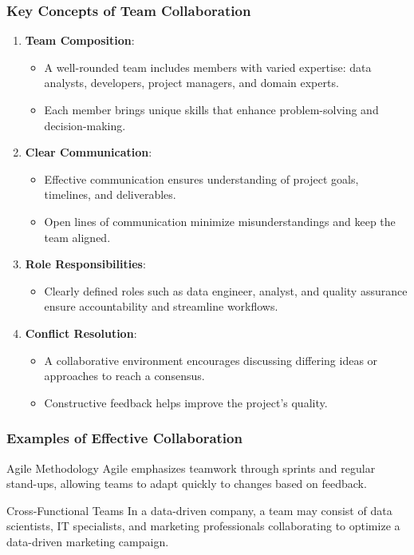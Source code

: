 \documentclass{beamer}
\begin{document}
\begin{frame}[fragile]
    \frametitle{Key Concepts of Team Collaboration}
    \begin{enumerate}
        \item \textbf{Team Composition}:
        \begin{itemize}
            \item A well-rounded team includes members with varied expertise: data analysts, developers, project managers, and domain experts.
            \item Each member brings unique skills that enhance problem-solving and decision-making.
        \end{itemize}

        \item \textbf{Clear Communication}:
        \begin{itemize}
            \item Effective communication ensures understanding of project goals, timelines, and deliverables.
            \item Open lines of communication minimize misunderstandings and keep the team aligned.
        \end{itemize}

        \item \textbf{Role Responsibilities}:
        \begin{itemize}
            \item Clearly defined roles such as data engineer, analyst, and quality assurance ensure accountability and streamline workflows.
        \end{itemize}

        \item \textbf{Conflict Resolution}: 
        \begin{itemize}
            \item A collaborative environment encourages discussing differing ideas or approaches to reach a consensus.
            \item Constructive feedback helps improve the project's quality.
        \end{itemize}
    \end{enumerate}
\end{frame}

\begin{frame}[fragile]
    \frametitle{Examples of Effective Collaboration}
    \begin{block}{Agile Methodology}
        Agile emphasizes teamwork through sprints and regular stand-ups, allowing teams to adapt quickly to changes based on feedback.
    \end{block}

    \begin{block}{Cross-Functional Teams}
        In a data-driven company, a team may consist of data scientists, IT specialists, and marketing professionals collaborating to optimize a data-driven marketing campaign.
    \end{block}
\end{frame}
\end{document}
